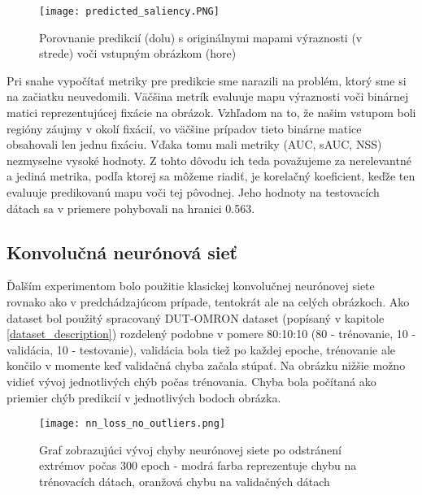 \begin{figure}[H]
	\begin{center}
		\texttt{[image: predicted\_saliency.PNG]}
		\caption[Porovnanie prvotných výsledkov]{
			Porovnanie predikcií (dolu) s originálnymi mapami výraznosti (v strede) voči vstupným obrázkom (hore)
		}\label{results_image}
	\end{center}
\end{figure}

Pri snahe vypočítať metriky pre predikcie sme narazili na problém, ktorý sme si na začiatku neuvedomili. Väčšina metrík evaluuje mapu výraznosti voči binárnej matici reprezentujúcej fixácie na obrázok. Vzhľadom na to, že našim vstupom boli regióny záujmy v okolí fixácií, vo väčšine prípadov tieto binárne matice obsahovali len jednu fixáciu. Vďaka tomu mali metriky (AUC, sAUC, NSS) nezmyselne vysoké hodnoty. Z tohto dôvodu ich teda považujeme za nerelevantné a jediná metrika, podľa ktorej sa môžeme riadiť, je korelačný koeficient, keďže ten evaluuje predikovanú mapu voči tej pôvodnej. Jeho hodnoty na testovacích dátach sa v priemere pohybovali na hranici 0.563.

\subsection{Konvolučná neurónová sieť}
\label{experiments_cnn}

Ďalším experimentom bolo použitie klasickej konvolučnej neurónovej siete rovnako ako v predchádzajúcom prípade, tentokrát ale na celých obrázkoch. Ako dataset bol použitý spracovaný DUT-OMRON dataset (popísaný v kapitole \ref{dataset_description}) rozdelený podobne v pomere 80:10:10 (80 - trénovanie, 10 - validácia, 10 - testovanie), validácia bola tiež po každej epoche, trénovanie ale končilo v momente keď validačná chyba začala stúpať. Na obrázku nižšie možno vidieť vývoj jednotlivých chýb počas trénovania. Chyba bola počítaná ako priemier chýb predikcií v jednotlivých bodoch obrázka.

\begin{figure}[H]
	\begin{center}
	\texttt{[image: nn\_loss\_no\_outliers.png]}
		\caption[Vývoj chyby počas trénovania konvolučnej neurónovej siete]{
			Graf zobrazujúci vývoj chyby neurónovej siete po odstránení extrémov počas 300 epoch - modrá farba reprezentuje chybu na trénovacích dátach, oranžová chybu na validačných dátach
		}\label{cnn_loss_outliers}
	\end{center}
\end{figure}

